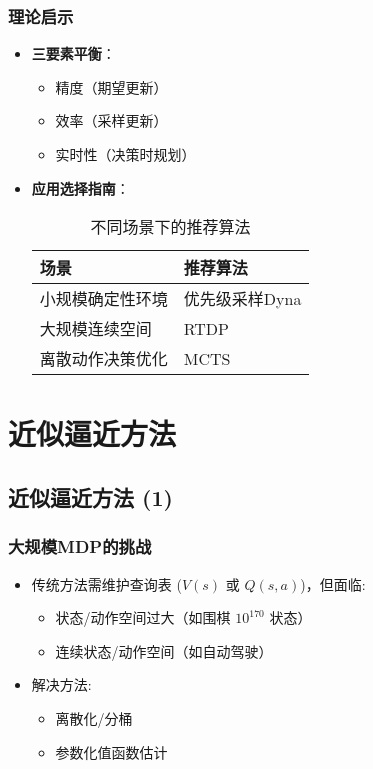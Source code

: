 \subsubsection{理论启示}
\begin{itemize}
    \item \textbf{三要素平衡}：
        \begin{itemize}
            \item 精度（期望更新）
            \item 效率（采样更新）
            \item 实时性（决策时规划）
        \end{itemize}
    \item \textbf{应用选择指南}：
       
        \begin{table}[H]  %
            \centering
            \caption{不同场景下的推荐算法}
            \begin{tabular}{ll}
            \toprule
            \textbf{场景} & \textbf{推荐算法} \\
            \midrule
            小规模确定性环境 & 优先级采样Dyna \\
            大规模连续空间 & RTDP \\
            离散动作决策优化 & MCTS \\
            \bottomrule
            \end{tabular}
        \end{table}

\end{itemize}

\section{近似逼近方法}
\subsection{近似逼近方法 (1)}

\subsubsection{大规模MDP的挑战}
\begin{itemize}
    \item 传统方法需维护查询表 ($V(s)$ 或 $Q(s,a)$)，但面临:
    \begin{itemize}
        \item 状态/动作空间过大（如围棋 $10^{170}$ 状态）
        \item 连续状态/动作空间（如自动驾驶）
    \end{itemize}
    \item 解决方法:
    \begin{itemize}
        \item 离散化/分桶
        \item 参数化值函数估计
    \end{itemize}
\end{itemize}

